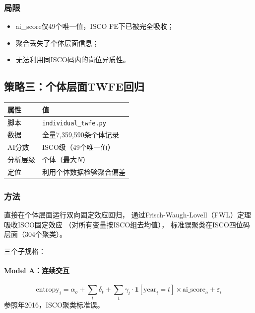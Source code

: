 \documentclass[12pt,a4paper]{ctexart}
\begin{document}
\subsubsection{局限}

\begin{itemize}
\item ai\_score仅49个唯一值，ISCO FE下已被完全吸收；
\item 聚合丢失了个体层面信息；
\item 无法利用同ISCO码内的岗位异质性。
\end{itemize}


\subsection{策略三：个体层面TWFE回归}
\label{subsec:twfe}

\begin{table}[h!]
\centering
\small
\begin{tabular}{ll}
\toprule
\textbf{属性} & \textbf{值} \\
\midrule
脚本 & \texttt{individual\_twfe.py} \\
数据 & 全量7,359,590条个体记录 \\
AI分数 & ISCO级（49个唯一值） \\
分析层级 & 个体（最大$N$） \\
定位 & 利用个体数据检验聚合偏差 \\
\bottomrule
\end{tabular}
\end{table}

\subsubsection{方法}

直接在个体层面运行双向固定效应回归，
通过Frisch-Waugh-Lovell（FWL）定理吸收ISCO固定效应
（对所有变量按ISCO组去均值），
标准误聚类在ISCO四位码层面（304个聚类）。

三个子规格：

\paragraph{Model A：连续交互}
\[
\text{entropy}_i = \alpha_o + \sum_t \delta_t
+ \sum_t \gamma_t \cdot \mathbf{1}[\text{year}_i = t]
\times \text{ai\_score}_o + \varepsilon_i
\]
参照年2016，ISCO聚类标准误。
\end{document}
